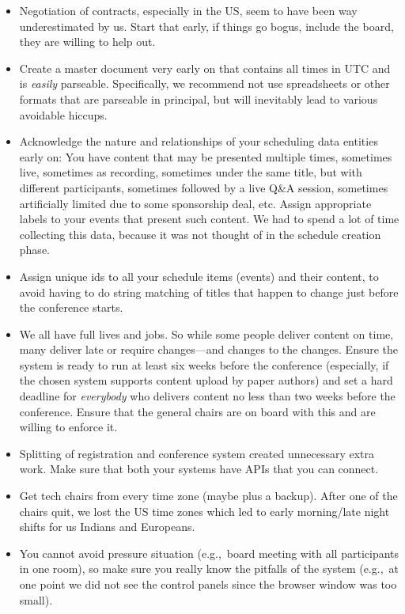 \documentclass[%
10pt,								%
titlepage,						%
]
{scrartcl}
\begin{document}
        \begin{itemize}
            \item Negotiation of contracts, especially in the US, seem to have been way underestimated by us. Start that early, if things go bogus, include the board, they are willing to help out.
            \item Create a master document very early on that contains all times in UTC and is \emph{easily} parseable. Specifically, we recommend not use spreadsheets or other formats that are parseable in principal, but will inevitably lead to various avoidable hiccups.
            \item Acknowledge the nature and relationships of your scheduling data entities early on: You have content that may be presented multiple times, sometimes live, sometimes as recording, sometimes under the same title, but with different participants, sometimes followed by a live Q\&A session, sometimes artificially limited due to some sponsorship deal, etc. Assign appropriate labels to your events that present such content. We had to spend a lot of time collecting this data, because it was not thought of in the schedule creation phase.
            \item Assign unique ids to all your schedule items (events) and their content, to avoid having to do string matching of titles that happen to change just before the conference starts.
            \item We all have full lives and jobs. So while some people deliver content on time, many deliver late or require changes---and changes to the changes. Ensure the system is ready to run at least six weeks before the conference (especially, if the chosen system supports content upload by paper authors) and set a hard deadline for \emph{everybody} who delivers content no less than two weeks before the conference. Ensure that the general chairs are on board with this and are willing to enforce it.
            \item Splitting of registration and conference system created unnecessary extra work. Make sure that both your systems have APIs that you can connect.
            \item Get tech chairs from every time zone (maybe plus a backup). After one of the chairs quit, we lost the US time zones which led to early morning/late night shifts for us Indians and Europeans.
            \item You cannot avoid pressure situation (e.g.,~board meeting with all participants in one room), so make sure you really know the pitfalls of the system (e.g.,~at one point we did not see the control panels since the browser window was too small).

\end{itemize}
\end{document}
